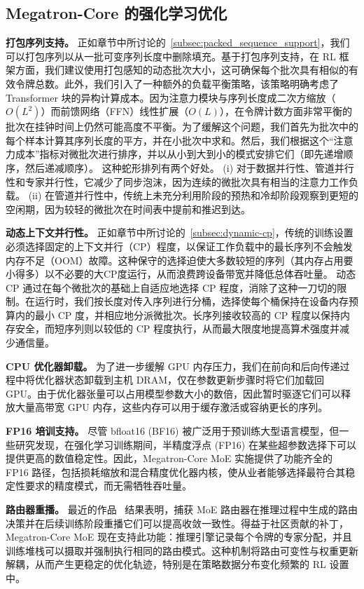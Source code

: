 \documentclass[10pt,logo,copyright]{nvidiatechreport_zh}
\begin{document}
\subsection{Megatron-Core 的强化学习优化}
\textbf{打包序列支持。} 正如章节中所讨论的~\ref{subsec:packed_sequence_support}，我们可以打包序列以从一批可变序列长度中删除填充。基于打包序列支持，在 RL 框架方面，我们建议使用打包感知的动态批次大小，这可确保每个批次具有相似的有效令牌总数。此外，我们引入了一种额外的负载平衡策略，该策略明确考虑了 Transformer 块的异构计算成本。因为注意力模块与序列长度成二次方缩放（\(O(L^{2})\)）而前馈网络（FFN）线性扩展（\(O(L)\)），在令牌计数方面非常平衡的批次在挂钟时间上仍然可能高度不平衡。为了缓解这个问题，我们首先为批次中的每个样本计算其序列长度的平方，并在小批次中求和。然后，我们根据这个“注意力成本”指标对微批次进行排序，并以从小到大到小的模式安排它们（即先递增顺序，然后递减顺序）。
这种蛇形排列有两个好处。 (i) 对于数据并行性、管道并行性和专家并行性，它减少了同步泡沫，因为连续的微批次具有相当的注意力工作负载。 (ii) 在管道并行性中，传统上未充分利用阶段的预热和冷却阶段观察到更短的空闲期，因为较轻的微批次在时间表中提前和推迟到达。

\textbf{动态上下文并行性。} 正如章节中所讨论的~\ref{subsec:dynamic-cp}，传统的训练设置必须选择固定的上下文并行（CP）程度，以保证工作负载中的最长序列不会触发内存不足（OOM）故障。这种保守的选择迫使大多数较短的序列（其内存占用要小得多）以不必要的大CP度运行，从而浪费跨设备带宽并降低总体吞吐量。
动态 CP 通过在每个微批次的基础上自适应地选择 CP 程度，消除了这种一刀切的限制。在运行时，我们按长度对传入序列进行分桶，选择使每个桶保持在设备内存预算内的最小 CP 度，并相应地分派微批次。长序列接收较高的 CP 程度以保持内存安全，而短序列则以较低的 CP 程度执行，从而最大限度地提高算术强度并减少通信量。

\textbf{CPU 优化器卸载。} 为了进一步缓解 GPU 内存压力，我们在前向和后向传递过程中将优化器状态卸载到主机 DRAM，仅在参数更新步骤时将它们加载回 GPU。由于优化器张量可以占用模型参数大小的数倍，因此暂时驱逐它们可以释放大量高带宽 GPU 内存，这些内存可以用于缓存激活或容纳更长的序列。

\textbf{FP16 培训支持。} 尽管 bfloat16 (BF16) 被广泛用于预训练大型语言模型，但一些研究发现，在强化学习训练期间，半精度浮点 (FP16) 在某些超参数选择下可以提供更高的数值稳定性。因此，Megatron-Core MoE 实施提供了功能齐全的 FP16 路径，包括损耗缩放和混合精度优化器内核，使从业者能够选择最符合其稳定性要求的精度模式，而无需牺牲吞吐量。

\textbf{路由器重播。} 最近的作品~\cite{fan2025routerreplay} 结果表明，捕获 MoE 路由器在推理过程中生成的路由决策并在后续训练阶段重播它们可以提高收敛一致性。得益于社区贡献的补丁，Megatron-Core MoE 现在支持此功能：推理引擎记录每个令牌的专家分配，并且训练堆栈可以摄取并强制执行相同的路由模式。这种机制将路由可变性与权重更新解耦，从而产生更稳定的优化轨迹，特别是在策略数据分布变化频繁的 RL 设置中。
\end{document}
